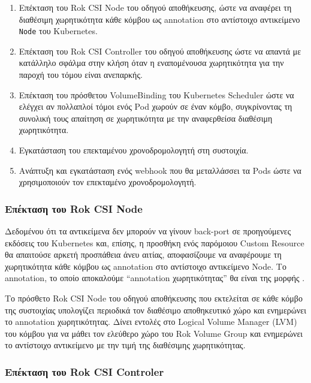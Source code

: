 \begin{enumerate}
      \tightlist
      \item Επέκταση του Rok CSI Node του οδηγού αποθήκευσης, ώστε να
            αναφέρει τη διαθέσιμη χωρητικότητα κάθε κόμβου ως annotation στο
            αντίστοιχο αντικείμενο \texttt{Node} του Kubernetes.
      \item Επέκταση του Rok CSI Controller του οδηγού αποθήκευσης
            ώστε να απαντά με κατάλληλο σφάλμα στην κλήση  όταν
            η εναπομένουσα χωρητικότητα για την παροχή του τόμου είναι
            ανεπαρκής.
      \item Επέκταση του πρόσθετου VolumeBinding του Kubernetes Scheduler ώστε
            να ελέγχει αν πολλαπλοί τόμοι ενός Pod χωρούν σε έναν κόμβο,
            συγκρίνοντας τη συνολική τους απαίτηση σε χωρητικότητα με την
            αναφερθείσα διαθέσιμη χωρητικότητα.
      \item Εγκατάσταση του επεκταμένου χρονοδρομολογητή στη συστοιχία.
      \item Ανάπτυξη και εγκατάσταση ενός  webhook που θα μεταλλάσσει τα Pods
            ώστε να χρησιμοποιούν τον επεκταμένο χρονοδρομολογητή.
\end{enumerate}

\subsubsection{Επέκταση του Rok CSI Node}

Δεδομένου ότι τα αντικείμενα  δεν μπορούν να γίνουν
back-port σε προηγούμενες εκδόσεις του Kubernetes και, επίσης, η προσθήκη ενός
παρόμοιου Custom Resource θα απαιτούσε αρκετή προσπάθεια άνευ αιτίας,
αποφασίζουμε να αναφέρουμε τη χωρητικότητα κάθε κόμβου ως annotation στο
αντίστοιχο αντικείμενο Node. Το annotation, το οποίο αποκαλούμε ``annotation
χωρητικότητας'' θα είναι της μορφής
.

Το πρόσθετο Rok CSI Node του οδηγού αποθήκευσης που εκτελείται σε κάθε κόμβο της
συστοιχίας υπολογίζει περιοδικά τον διαθέσιμο αποθηκευτικό χώρο και ενημερώνει
το annotation χωρητικότητας. Δίνει εντολές στο Logical Volume Manager (LVM) του
κόμβου για να μάθει τον ελεύθερο χώρο του Rok Volume Group και ενημερώνει το
αντίστοιχο  αντικείμενο με την τιμή της διαθέσιμης χωρητικότητας.

\subsubsection{Επέκταση του Rok CSI Controler}

